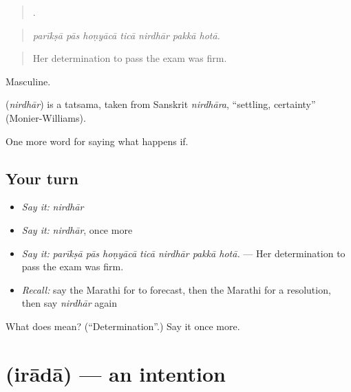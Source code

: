 \begin{quote}
      .
\end{quote}

\begin{quote}
\emph{parīkṣā pās hoṇyācā ticā nirdhār pakkā hotā.}
\end{quote}

\begin{quote}
Her determination to pass the exam was firm.
\end{quote}

Masculine.

\begin{cousinweb}
\textbf{} (\emph{nirdhār}) is a tatsama, taken from Sanskrit \emph{nirdhāra}, \textquotedblleft{}settling, certainty\textquotedblright{} (Monier-Williams).
\end{cousinweb}

\begin{grammarlens}[title={What you've built}]
One more word for saying what happens if.
\end{grammarlens}

\subsection*{Your turn}
\begin{itemize}
\raggedright
  \item \emph{Say it:} \emph{nirdhār}
  \item \emph{Say it:} \emph{nirdhār}, once more
  \item \emph{Say it:} \emph{parīkṣā pās hoṇyācā ticā nirdhār pakkā hotā.} — Her determination to pass the exam was firm.
  \item \emph{Recall:} say the Marathi for to forecast, then the Marathi for a resolution, then say \emph{nirdhār} again
\end{itemize}

\begin{tcolorbox}[breakable,colback=teal!4,colframe=teal!35!black,title={Before you move on}]
What does  mean? (\textquotedblleft{}Determination\textquotedblright{}.) Say it once more.
\end{tcolorbox}
\section[\texorpdfstring{\mr{इरादा} (irādā)}{इरादा (irādā)}]{ (irādā) — an intention}

